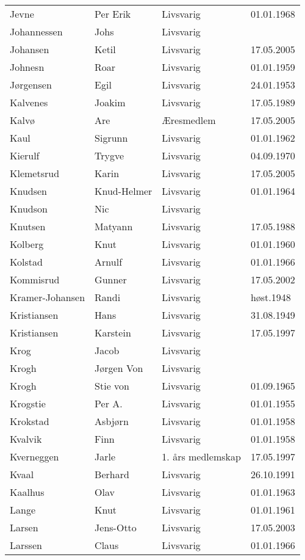 \documentclass[fsbok.tex]{subfiles}
\begin{document}
\begin{longtable}{llll}
Jevne	&	Per Erik	&	Livsvarig 	&	01.01.1968	\\
Johannessen	&	Johs	&	Livsvarig 	&		\\
Johansen 	&	Ketil	&	Livsvarig	&	17.05.2005	\\
Johnesn	&	Roar	&	Livsvarig 	&	01.01.1959	\\
Jørgensen	&	Egil	&	Livsvarig 	&	24.01.1953	\\
Kalvenes	&	Joakim	&	Livsvarig 	&	17.05.1989	\\
Kalvø 	&	Are 	&	Æresmedlem	&	17.05.2005	\\
Kaul	&	Sigrunn	&	Livsvarig 	&	01.01.1962	\\
Kierulf	&	Trygve	&	Livsvarig 	&	04.09.1970	\\
Klemetsrud 	&	Karin	&	Livsvarig	&	17.05.2005	\\
Knudsen	&	Knud-Helmer	&	Livsvarig 	&	01.01.1964	\\
Knudson	&	Nic	&	Livsvarig 	&		\\
Knutsen	&	Matyann	&	Livsvarig 	&	17.05.1988	\\
Kolberg	&	Knut	&	Livsvarig 	&	01.01.1960	\\
Kolstad	&	Arnulf	&	Livsvarig 	&	01.01.1966	\\
Kommisrud 	&	Gunner	&	Livsvarig	&	17.05.2002	\\
Kramer-Johansen	&	Randi	&	Livsvarig 	&	høst.1948	\\
Kristiansen	&	Hans	&	Livsvarig 	&	31.08.1949	\\
Kristiansen 	&	Karstein	&	Livsvarig	&	17.05.1997	\\
Krog	&	Jacob	&	Livsvarig 	&		\\
Krogh	&	Jørgen Von	&	Livsvarig 	&		\\
Krogh	&	Stie von	&	Livsvarig 	&	01.09.1965	\\
Krogstie	&	Per A.	&	Livsvarig 	&	01.01.1955	\\
Krokstad	&	Asbjørn	&	Livsvarig 	&	01.01.1958	\\
Kvalvik	&	Finn	&	Livsvarig 	&	01.01.1958	\\
Kverneggen 	&	Jarle 	&	1. års medlemskap	&	17.05.1997	\\
Kvaal	&	Berhard	&	Livsvarig 	&	26.10.1991	\\
Kaalhus	&	Olav	&	Livsvarig 	&	01.01.1963	\\
Lange	&	Knut	&	Livsvarig 	&	01.01.1961	\\
Larsen 	&	Jens-Otto	&	Livsvarig	&	17.05.2003	\\
Larssen	&	Claus	&	Livsvarig 	&	01.01.1966	\\

\end{longtable}
\end{document}
